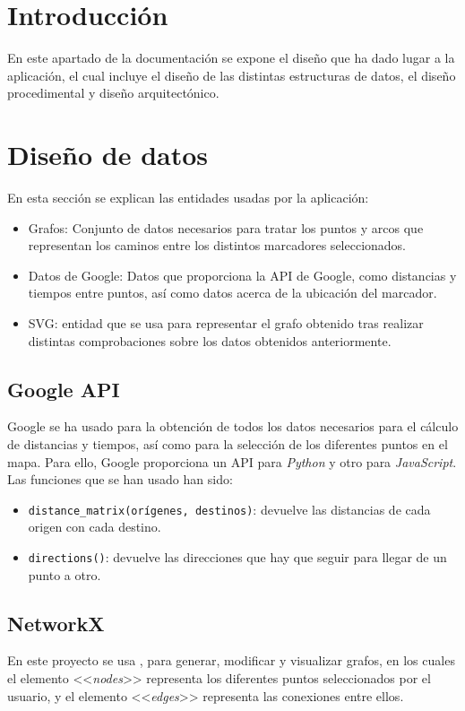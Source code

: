 
\section{Introducción}
En este apartado de la documentación se expone el diseño que ha dado lugar a la aplicación, el cual incluye el diseño de las distintas estructuras de datos, el diseño procedimental y diseño arquitectónico.

\section{Diseño de datos}
En esta sección se explican las entidades usadas por la aplicación:
\begin{itemize}
	\item Grafos: Conjunto de datos necesarios para tratar los puntos y arcos que representan los caminos entre los distintos marcadores seleccionados.
	\item Datos de Google: Datos que proporciona la API de Google, como distancias y tiempos entre puntos, así como datos acerca de la ubicación del marcador.
	\item SVG: entidad que se usa para representar el grafo obtenido tras realizar distintas comprobaciones sobre los datos obtenidos anteriormente.
\end{itemize}

\subsection{Google API}
Google se ha usado para la obtención de todos los datos necesarios para el cálculo de distancias y tiempos, así como para la selección de los diferentes puntos en el mapa. Para ello, Google proporciona un API para \textit{Python} y otro para \textit{JavaScript}. Las funciones que se han usado han sido:
\begin{itemize}
	\item \texttt{distance\_matrix(orígenes, destinos)}: devuelve las distancias de cada origen con cada destino.
	\item \texttt{directions()}: devuelve las direcciones que hay que seguir para llegar de un punto a otro.
\end{itemize}

\subsection{NetworkX}
En este proyecto se usa , para generar, modificar y visualizar grafos, en los cuales el elemento <<\textit{nodes}>> representa los diferentes puntos seleccionados por el usuario, y el elemento <<\textit{edges}>> representa las conexiones entre ellos.


